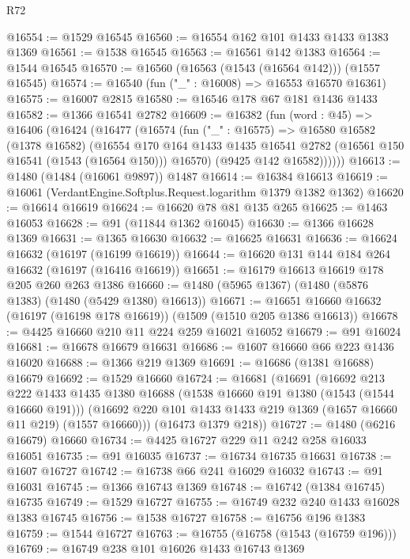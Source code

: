 \begin{lexlean}{R72}
\begin{coremodule}
@16554 := @1529 @16545
@16560 := @16554 @162 @101 @1433 @1433 @1383 @1369
@16561 := @1538 @16545
@16563 := @16561 @142 @1383
@16564 := @1544 @16545
@16570 := @16560 (@16563 (@1543 (@16564 @142))) (@1557 @16545)
@16574 := @16540 (fun ("_" : @16008) => @16553 @16570 @16361)
@16575 := @16007 @2815
@16580 := @16546 @178 @67 @181 @1436 @1433
@16582 := @1366 @16541 @2782
@16609 := @16382
    (fun (word : @45) =>
    @16406
      (@16424
        (@16477
          (@16574
            (fun ("_" : @16575) =>
            @16580
              @16582
              (@1378 @16582)
              (@16554
                @170
                @164
                @1433
                @1435
                @16541
                @2782
                (@16561 @150 @16541 (@1543 (@16564 @150)))
                @16570)
              (@9425 @142 @16582))))))
@16613 := @1480 (@1484 (@16061 @9897)) @1487
@16614 := @16384 @16613
@16619 := @16061 (VerdantEngine.Softplus.Request.logarithm @1379 @1382 @1362)
@16620 := @16614 @16619
@16624 := @16620 @78 @81 @135 @265
@16625 := @1463 @16053
@16628 := @91 (@11844 @1362 @16045)
@16630 := @1366 @16628 @1369
@16631 := @1365 @16630
@16632 := @16625 @16631
@16636 := @16624 @16632 (@16197 (@16199 @16619))
@16644 := @16620 @131 @144 @184 @264 @16632 (@16197 (@16416 @16619))
@16651 := @16179 @16613 @16619 @178 @205 @260 @263 @1386
@16660 := @1480 (@5965 @1367) (@1480 (@5876 @1383) (@1480 (@5429 @1380) @16613))
@16671 := @16651 @16660 @16632 (@16197 (@16198 @178 @16619)) (@1509 (@1510 @205 @1386 @16613))
@16678 := @4425 @16660 @210 @11 @224 @259 @16021 @16052
@16679 := @91 @16024
@16681 := @16678 @16679 @16631
@16686 := @1607 @16660 @66 @223 @1436 @16020
@16688 := @1366 @219 @1369
@16691 := @16686 (@1381 @16688) @16679
@16692 := @1529 @16660
@16724 := @16681
    (@16691
      (@16692
        @213
        @222
        @1433
        @1435
        @1380
        @16688
        (@1538 @16660 @191 @1380 (@1543 (@1544 @16660 @191)))
        (@16692 @220 @101 @1433 @1433 @219 @1369 (@1657 @16660 @11 @219) (@1557 @16660)))
      (@16473 @1379 @218))
@16727 := @1480 (@6216 @16679) @16660
@16734 := @4425 @16727 @229 @11 @242 @258 @16033 @16051
@16735 := @91 @16035
@16737 := @16734 @16735 @16631
@16738 := @1607 @16727
@16742 := @16738 @66 @241 @16029 @16032
@16743 := @91 @16031
@16745 := @1366 @16743 @1369
@16748 := @16742 (@1384 @16745) @16735
@16749 := @1529 @16727
@16755 := @16749 @232 @240 @1433 @16028 @1383 @16745
@16756 := @1538 @16727
@16758 := @16756 @196 @1383
@16759 := @1544 @16727
@16763 := @16755 (@16758 (@1543 (@16759 @196)))
@16769 := @16749 @238 @101 @16026 @1433 @16743 @1369

\end{coremodule}
\end{lexlean}
